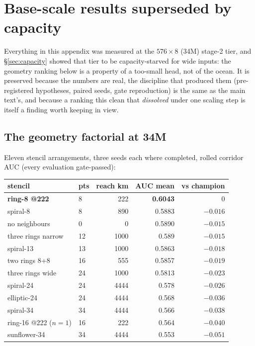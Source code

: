 \documentclass[10pt]{article}
\begin{document}
\appendix

\section{Base-scale results superseded by capacity}\label{app:base}

Everything in this appendix was measured at the $576\times8$ (34M)
stage-2 tier, and \S\ref{sec:capacity} showed that tier to be
capacity-starved for wide inputs: the geometry ranking below is a
property of a too-small head, not of the ocean. It is preserved because
the numbers are real, the discipline that produced them (pre-registered
hypotheses, paired seeds, gate reproduction) is the same as the main
text's, and because a ranking this clean that \emph{dissolved} under one
scaling step is itself a finding worth keeping in view.

\subsection{The geometry factorial at 34M}

Eleven stencil arrangements, three seeds each where completed, rolled
corridor AUC (every evaluation gate-passed):

\begin{center}\small
\begin{tabular}{llrrr}
\toprule
stencil & pts & reach km & AUC mean & vs champion \\
\midrule
\textbf{ring-8 @222} & 8 & 222 & \textbf{0.6043} & 0 \\
spiral-8 & 8 & 890 & 0.5883 & $-0.016$ \\
no neighbours & 0 & 0 & 0.5890 & $-0.015$ \\
three rings narrow & 12 & 1000 & 0.589 & $-0.015$ \\
spiral-13 & 13 & 1000 & 0.5863 & $-0.018$ \\
two rings 8+8 & 16 & 555 & 0.5857 & $-0.019$ \\
three rings wide & 24 & 1000 & 0.5813 & $-0.023$ \\
spiral-24 & 24 & 4444 & 0.578 & $-0.026$ \\
elliptic-24 & 24 & 4444 & 0.568 & $-0.036$ \\
spiral-34 & 34 & 4444 & 0.566 & $-0.038$ \\
ring-16 @222 ($n{=}1$) & 16 & 222 & 0.564 & $-0.040$ \\
sunflower-34 & 34 & 4444 & 0.553 & $-0.051$ \\
\bottomrule
\end{tabular}
\end{center}
\end{document}

